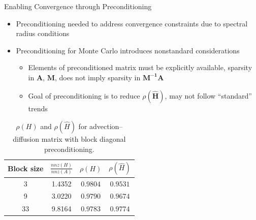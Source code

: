 \documentclass{beamer}
\begin{document}
\begin{frame}{Enabling Convergence through Preconditioning}
  \begin{itemize}
    \item Preconditioning needed to address convergence constraints due to
      spectral radius conditions
    \item Preconditioning for Monte Carlo introduces nonstandard considerations
      \begin{itemize}
      \item Elements of preconditioned matrix must be explicitly available,
        sparsity in $\mathbf{A}$, $\mathbf{M}$, does not imply sparsity in
        $\mathbf{M^{-1}A}$
        \item Goal of preconditioning is to reduce $\rho(\hat{\mathbf{H}})$,
          may not follow ``standard'' trends
      \end{itemize}
  \end{itemize}
  \vfill

  \begin{table}
  \centering
  \begin{tabular}{cccc}
  \toprule
  \textbf{Block size} & \textbf{$\frac{nnz(H)}{nnz(A)}$}& $\rho(H)$
  &$\rho(\hat{H})$\\
  \midrule
   3 & 1.4352 & $0.9804$ & $0.9531$\\
   9 & 3.0220 & $0.9790$ & $0.9674$\\
   33 & 9.8164 & $0.9783$  & $0.9774$\\
  \bottomrule
  \end{tabular}
  \caption{$\rho(H)$ and $\rho(\hat{H})$ for advection--diffusion
  matrix with block diagonal preconditioning.}
  \label{tab:ifiss_block}
  \end{table}
\end{frame}

\end{document}
